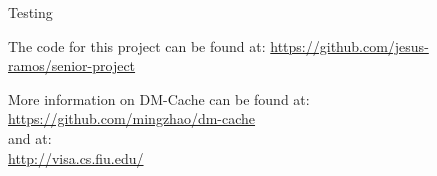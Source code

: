 \documentclass[final,12pt]{beamer}
\begin{document}
\begin{frame}{}
\begin{columns}
\begin{column}{.5\linewidth}
\begin{block}{\large Testing}
        \vspace{\baselineskip}

        The code for this project can be found at:
        \url{https://github.com/jesus-ramos/senior-project}

        More information on DM-Cache can be found at:
        \url{https://github.com/mingzhao/dm-cache} \\
        and at: \\
        \url{http://visa.cs.fiu.edu/}

      \end{block}
    \end{column}

  \end{columns}


\end{frame}
\end{document}
